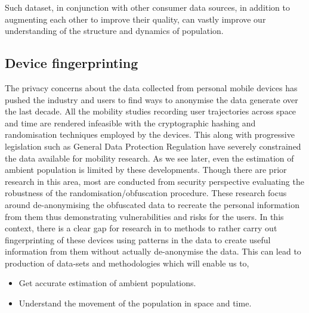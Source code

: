 Such dataset, in conjunction with other consumer data sources, in addition to augmenting each other to improve their quality, can vastly improve our understanding of the structure and dynamics of population.

\subsection{Device fingerprinting}


The privacy concerns about the data collected from personal mobile devices has pushed the industry and users to find ways to anonymise the data generate over the last decade.
All the mobility studies recording user trajectories across space and time are rendered infeasible with the cryptographic hashing and randomisation techniques employed by the devices. 
This along with progressive legislation such as General Data Protection Regulation have severely constrained the data available for mobility research.
As we see later, even the estimation of ambient population is limited by these developments.
Though there are prior research in this area, most are conducted from security perspective evaluating the robustness of the randomisation/obfuscation procedure.
These research focus around de-anonymising the obfuscated data to recreate the personal information from them thus demonstrating vulnerabilities and risks for the users. 
In this context, there is a clear gap for research in to methods to rather carry out  fingerprinting of these devices using patterns in the data to create useful information from them without actually de-anonymise the data.
This can lead to production of data-sets and methodologies which will enable us to,

\begin{itemize}
  \setlength{\itemindent}{2em}
  \itemsep-0.25em
  \item Get accurate estimation of ambient populations.
  \item Understand the movement of the population in space and time.
\end{itemize}

